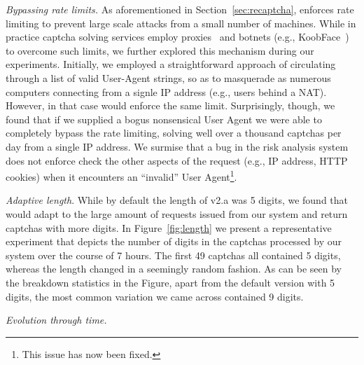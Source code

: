 \emph{Bypassing rate limits.} As aforementioned in Section~\ref{sec:recaptcha}, \re enforces 
rate limiting to prevent large scale attacks from a small number of machines. While in practice
captcha solving services employ proxies~\cite{captcha_proxies} and botnets (e.g., KoobFace~\cite{captcha_solvers}) 
to overcome such limits, we further explored this mechanism during our experiments. Initially,
we employed a straightforward approach of circulating through a list of valid User-Agent strings,
so as to masquerade as numerous computers connecting from a signle IP address (e.g., users behind a NAT).
However, in that case \re would enforce the same limit. Surprisingly, though, we found that if we 
supplied a bogus nonsensical User Agent we were able to completely bypass the rate limiting, solving 
well over a thousand captchas per day from a single IP address. We surmise that a bug in the risk analysis 
system does not enforce check the other aspects of the request (e.g., IP address, HTTP cookies) when 
it encounters an ``invalid'' User Agent\footnote{This issue has now been fixed.}.

\emph{Adaptive length}.
While by default the length of \re v2.a was 5 digits, we found %
that \re would adapt to the large amount of requests issued from our system and return captchas with more digits. 
In Figure~\ref{fig:length} we present a representative experiment that depicts the number of digits in the captchas
processed by our system over the course of 7 hours. The first 49 captchas all contained 5 digits, whereas the length
changed in a seemingly random fashion. As can be seen by the breakdown statistics in the Figure, apart from the default
version with 5 digits, the most common variation we came across contained 9 digits.

\emph{Evolution through time.} 
